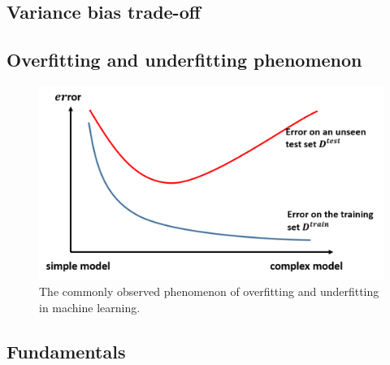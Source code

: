 \begin{refsection}
\section{Variance bias trade-off}

\subsection{Overfitting and underfitting phenomenon}

\begin{figure}
	\centering
	\includegraphics[width=0.6\linewidth]{../figures/statisticalLearning/supervisedLearningPrinciples/underFittingOverfittingDemo}
	\caption{The commonly observed phenomenon of overfitting and underfitting in machine learning. }
	\label{fig:underfittingoverfittingdemo}
\end{figure}





\subsection{Fundamentals}


\end{refsection}
